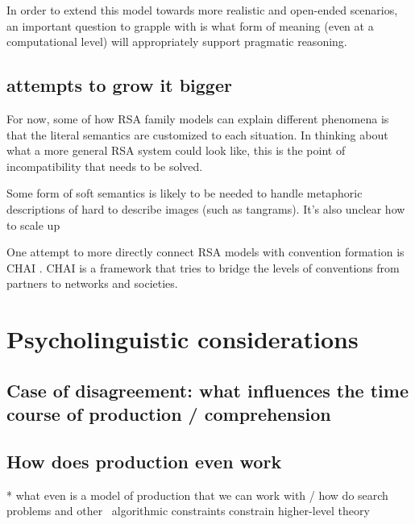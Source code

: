 \documentclass[]{article}
\begin{document}


In order to extend this model towards more realistic and open-ended scenarios, an important question to grapple with is what form of meaning (even at a computational level) will appropriately support pragmatic reasoning. 





\subsection{attempts to grow it bigger}


For now, some of how RSA family models can explain different phenomena is that the literal semantics are customized to each situation. In thinking about what a more general RSA system could look like, this is the point of incompatibility that needs to be solved. 

Some form of soft semantics is likely to be needed to handle metaphoric descriptions of hard to describe images (such as tangrams). It's also unclear how to scale up 

One attempt to more directly connect RSA models with convention formation is  CHAI \cite{hawkins2021}. CHAI is a framework that tries to bridge the levels of conventions from partners to networks and societies. 





\section{Psycholinguistic considerations}

\subsection{Case of disagreement: what influences the time course of production / comprehension }

\subsection{How does production even work}
* what even is a model of production that we can work with / how do search problems and other ~algorithmic constraints constrain higher-level theory
\end{document}
